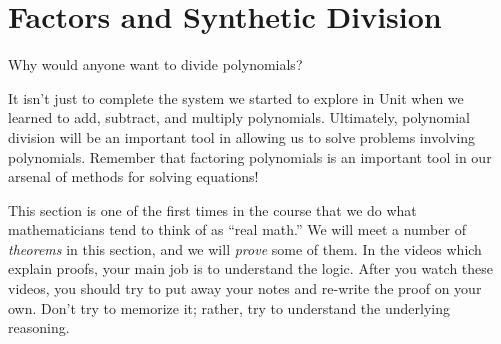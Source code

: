 \section{Factors and Synthetic Division}
Why would anyone want to divide polynomials?

It isn't just to complete the system we started to explore in Unit  when we learned to add, subtract, and multiply polynomials. Ultimately, polynomial division will be an important tool in allowing us to solve problems involving polynomials. Remember that factoring polynomials is an important tool in our arsenal of methods for solving equations!

This section is one of the first times in the course that we do what mathematicians tend to think of as ``real math.'' We will meet a number of \emph{theorems} in this section, and we will \emph{prove} some of them. In the videos which explain proofs, your main job is to understand the logic. After you watch these videos, you should try to put away your notes and re-write the proof on your own. Don't try to memorize it; rather, try to understand the underlying reasoning.

 
 
 



 



